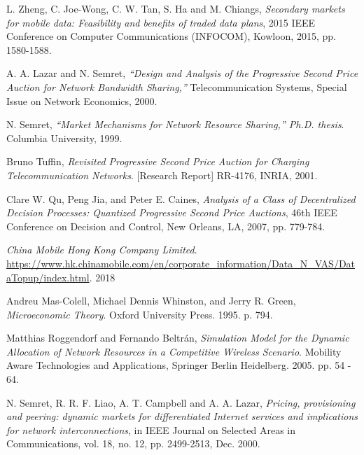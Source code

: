 \documentclass[sigconf, anonymous]{acmart}
\theoremstyle{definition}
\begin{document}
\begin{thebibliography}{9}

L. Zheng, C. Joe-Wong, C. W. Tan, S. Ha and M. Chiangs, 
\textit{Secondary markets for mobile data: Feasibility and benefits of traded
data plans}, 2015 IEEE
Conference on Computer Communications (INFOCOM), Kowloon, 2015, pp. 1580-1588.

A. A. Lazar and N. Semret, 
\textit{“Design and Analysis of the Progressive Second Price Auction for Network
Bandwidth Sharing,”} Telecommunication Systems, Special Issue on Network Economics, 2000.

N. Semret, 
\textit{“Market Mechanisms for Network Resource Sharing,”
Ph.D. thesis}. 
Columbia University, 1999.

Bruno Tuffin,
\textit{Revisited Progressive Second Price Auction for Charging
Telecommunication Networks}.
[Research Report] RR-4176, INRIA, 2001.

Clare W. Qu, Peng Jia, and Peter E. Caines,
\textit{Analysis of a Class of Decentralized Decision Processes: Quantized
Progressive Second Price Auctions},
46th IEEE Conference on Decision and Control, New Orleans, LA, 2007, pp.
779-784.

\textit{China Mobile Hong Kong Company Limited}.
\url{https://www.hk.chinamobile.com/en/corporate_information/Data_N_VAS/DataTopup/index.html}.
2018

Andreu Mas-Colell, Michael Dennis Whinston, and Jerry R. Green, 
\textit{Microeconomic Theory}. Oxford University Press. 1995. p. 794.

Matthias Roggendorf and Fernando Beltr{\'a}n,
\textit{Simulation Model for the Dynamic Allocation of Network Resources in a
Competitive Wireless Scenario}. Mobility Aware Technologies and Applications, Springer Berlin Heidelberg. 2005.
pp. 54 - 64.

N. Semret, R. R. F. Liao, A. T. Campbell and A. A. Lazar, 
\textit{Pricing, provisioning and peering: dynamic markets for differentiated Internet services and
implications for network interconnections}, in IEEE Journal on Selected Areas in
Communications, vol. 18, no. 12, pp. 2499-2513, Dec. 2000.

\end{thebibliography}
\end{document}

